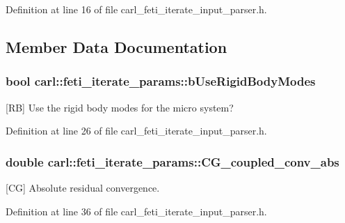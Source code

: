 Definition at line 16 of file carl\+\_\+feti\+\_\+iterate\+\_\+input\+\_\+parser.\+h.



\subsection{Member Data Documentation}
\hypertarget{structcarl_1_1feti__iterate__params_a934be934df429fddea7600c8965bca89}{}
\subsubsection[{b\+Use\+Rigid\+Body\+Modes}]{\setlength{\rightskip}{0pt plus 5cm}bool carl\+::feti\+\_\+iterate\+\_\+params\+::b\+Use\+Rigid\+Body\+Modes}\label{structcarl_1_1feti__iterate__params_a934be934df429fddea7600c8965bca89}


\mbox{[}R\+B\mbox{]} Use the rigid body modes for the micro system? 



Definition at line 26 of file carl\+\_\+feti\+\_\+iterate\+\_\+input\+\_\+parser.\+h.

\hypertarget{structcarl_1_1feti__iterate__params_a60effd55cacd7ea048aef5d603d7b763}{}
\subsubsection[{C\+G\+\_\+coupled\+\_\+conv\+\_\+abs}]{\setlength{\rightskip}{0pt plus 5cm}double carl\+::feti\+\_\+iterate\+\_\+params\+::\+C\+G\+\_\+coupled\+\_\+conv\+\_\+abs}\label{structcarl_1_1feti__iterate__params_a60effd55cacd7ea048aef5d603d7b763}


\mbox{[}C\+G\mbox{]} Absolute residual convergence. 



Definition at line 36 of file carl\+\_\+feti\+\_\+iterate\+\_\+input\+\_\+parser.\+h.

\hypertarget{structcarl_1_1feti__iterate__params_ac059145cfe8efc1f101e3dca789cf74d}{}

